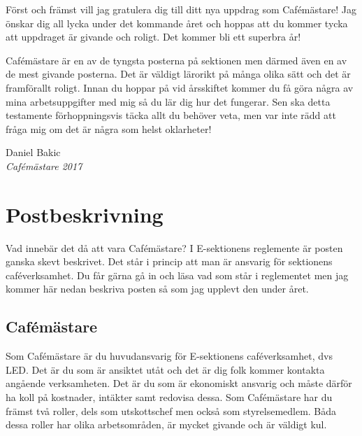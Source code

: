 \documentclass[10pt]{article}
\begin{document}
\heading{\doctitle}

Först och främst vill jag gratulera dig till ditt nya uppdrag som Cafémästare! Jag önskar dig all lycka under det kommande året och hoppas att du kommer tycka att uppdraget är givande och roligt. Det kommer bli ett superbra år!

Cafémästare är en av de tyngsta posterna på sektionen men därmed även en av de mest givande posterna. Det är väldigt lärorikt på många olika sätt och det är framförallt roligt. Innan du hoppar på vid årsskiftet kommer du få göra några av mina arbetsuppgifter med mig så du lär dig hur det fungerar. Sen ska detta testamente förhoppningsvis täcka allt du behöver veta, men var inte rädd att fråga mig om det är några som helst oklarheter!

Daniel Bakic\\
\emph{Cafémästare 2017}

\newpage
\tableofcontents

\newpage
\section{Postbeskrivning}
Vad innebär det då att vara Cafémästare? I E-sektionens reglemente är posten ganska skevt beskrivet. Det står i princip att man är ansvarig för sektionens caféverksamhet. Du får gärna gå in och läsa vad som står i reglementet men jag kommer här nedan beskriva posten så som jag upplevt den under året.

\subsection{Cafémästare}
Som Cafémästare är du huvudansvarig för E-sektionens caféverksamhet, dvs LED. Det är du som är ansiktet utåt och det är dig folk kommer kontakta angående verksamheten. Det är du som är ekonomiskt ansvarig och måste därför ha koll på kostnader, intäkter samt redovisa dessa. Som Cafémästare har du främst två roller, dels som utskottschef men också som styrelsemedlem. Båda dessa roller har olika arbetsområden, är mycket givande och är väldigt kul.
\end{document}
